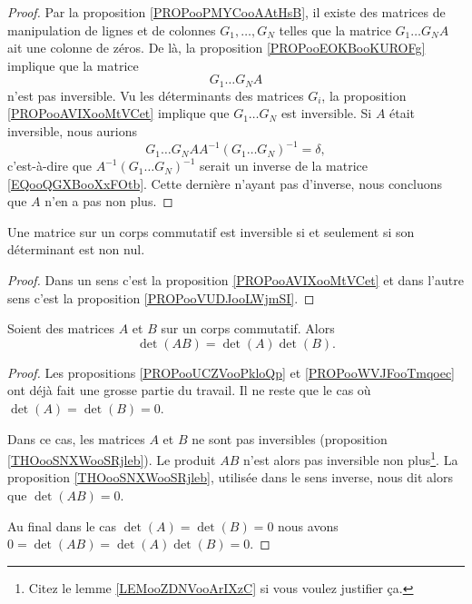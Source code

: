\begin{proof}
    Par la proposition \ref{PROPooPMYCooAAtHsB}, il existe des matrices de manipulation de lignes et de colonnes \( G_1,\ldots, G_N\) telles que la matrice \( G_1\ldots G_NA\) ait une colonne de zéros. De là, la proposition \ref{PROPooEOKBooKUROFg} implique que la matrice
    \begin{equation}        \label{EQooQGXBooXxFOtb}
        G_1\ldots G_NA
    \end{equation}
    n'est pas inversible. Vu les déterminants des matrices \( G_i\),  la proposition \ref{PROPooAVIXooMtVCet} implique que \( G_1\ldots G_N\) est inversible. Si \( A\) était inversible, nous aurions
    \begin{equation}
        G_1\dots G_NAA^{-1}(G_1\ldots G_N)^{-1}=\delta,
    \end{equation}
    c'est-à-dire que \( A^{-1}(G_1\ldots G_N)^{-1}\) serait un inverse de la matrice \eqref{EQooQGXBooXxFOtb}. Cette dernière n'ayant pas d'inverse, nous concluons que \( A\) n'en a pas non plus.
\end{proof}

\begin{theorem}     \label{THOooSNXWooSRjleb}
    Une matrice sur un corps commutatif est inversible si et seulement si son déterminant est non nul.
\end{theorem}

\begin{proof}
    Dans un sens c'est la proposition \ref{PROPooAVIXooMtVCet} et dans l'autre sens c'est la proposition \ref{PROPooVUDJooLWjmSI}.
\end{proof}


\begin{proposition}     \label{PROPooHQNPooIfPEDH}
    Soient des matrices \( A\) et \( B\) sur un corps commutatif. Alors
    \begin{equation}
        \det(AB)=\det(A)\det(B).
    \end{equation}
\end{proposition}

\begin{proof}
    Les propositions \ref{PROPooUCZVooPkloQp} et \ref{PROPooWVJFooTmqoec} ont déjà fait une grosse partie du travail. Il ne reste que le cas où \( \det(A)=\det(B)=0\).

    Dans ce cas, les matrices \( A\) et \( B\) ne sont pas inversibles (proposition \ref{THOooSNXWooSRjleb}). Le produit \( AB\) n'est alors pas inversible non plus\footnote{Citez le lemme \ref{LEMooZDNVooArIXzC} si vous voulez justifier ça.}. La proposition \ref{THOooSNXWooSRjleb}, utilisée dans le sens inverse, nous dit alors que \( \det(AB)=0\).

    Au final dans le cas \( \det(A)=\det(B)=0\) nous avons \( 0=\det(AB)=\det(A)\det(B)=0\).
\end{proof}

